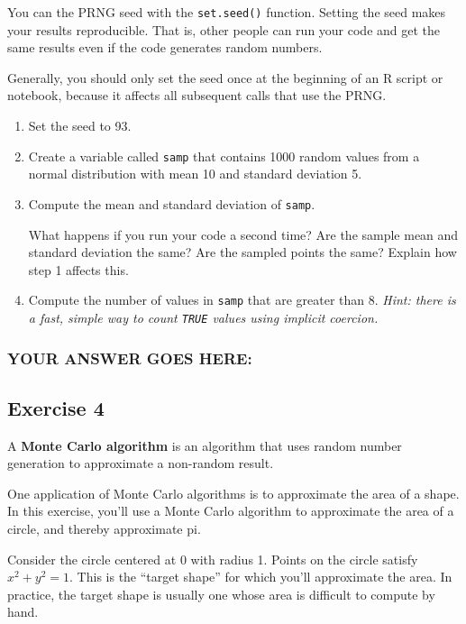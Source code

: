 \documentclass[
]{article}
\begin{document}
You can the PRNG seed with the \texttt{set.seed()} function. Setting the
seed makes your results reproducible. That is, other people can run your
code and get the same results even if the code generates random numbers.

Generally, you should only set the seed once at the beginning of an R
script or notebook, because it affects all subsequent calls that use the
PRNG.

\begin{enumerate}
\def\labelenumi{\arabic{enumi}.}
\item
  Set the seed to 93.
\item
  Create a variable called \texttt{samp} that contains 1000 random
  values from a normal distribution with mean 10 and standard deviation
  5.
\item
  Compute the mean and standard deviation of \texttt{samp}.

  What happens if you run your code a second time? Are the sample mean
  and standard deviation the same? Are the sampled points the same?
  Explain how step 1 affects this.
\item
  Compute the number of values in \texttt{samp} that are greater than 8.
  \emph{Hint: there is a fast, simple way to count \texttt{TRUE} values
  using implicit coercion.}
\end{enumerate}

\hypertarget{your-answer-goes-here-2}{%
\subsubsection{YOUR ANSWER GOES HERE:}\label{your-answer-goes-here-2}}

\hypertarget{exercise-4}{%
\subsection{Exercise 4}\label{exercise-4}}

A \textbf{Monte Carlo algorithm} is an algorithm that uses random number
generation to approximate a non-random result.

One application of Monte Carlo algorithms is to approximate the area of
a shape. In this exercise, you'll use a Monte Carlo algorithm to
approximate the area of a circle, and thereby approximate pi.

Consider the circle centered at 0 with radius 1. Points on the circle
satisfy \(x^2 + y^2 = 1\). This is the ``target shape'' for which you'll
approximate the area. In practice, the target shape is usually one whose
area is difficult to compute by hand.
\end{document}
